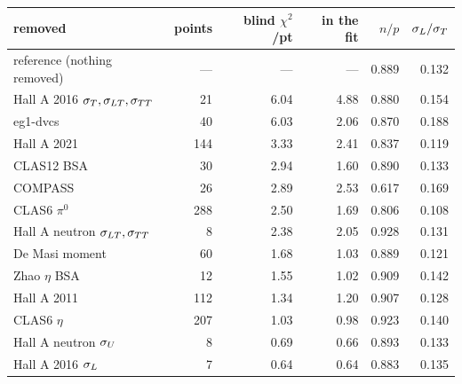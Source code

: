 \begin{tabular}{lrrrrr}
\toprule
removed & points & blind $\chi^2$/pt & in the fit & $n/p$ & $\sigma_{L}/\sigma_{T}$ \\
\midrule
reference (nothing removed) & --- & --- & --- & 0.889 & 0.132 \\
\midrule
Hall A 2016 $\sigma_{T},\sigma_{LT},\sigma_{TT}$ & 21 & 6.04 & 4.88 & 0.880 & 0.154 \\
eg1-dvcs & 40 & 6.03 & 2.06 & 0.870 & 0.188 \\
Hall A 2021 & 144 & 3.33 & 2.41 & 0.837 & 0.119 \\
CLAS12 BSA & 30 & 2.94 & 1.60 & 0.890 & 0.133 \\
COMPASS & 26 & 2.89 & 2.53 & 0.617 & 0.169 \\
CLAS6 $\pi^0$ & 288 & 2.50 & 1.69 & 0.806 & 0.108 \\
Hall A neutron $\sigma_{LT},\sigma_{TT}$ & 8 & 2.38 & 2.05 & 0.928 & 0.131 \\
De Masi moment & 60 & 1.68 & 1.03 & 0.889 & 0.121 \\
Zhao $\eta$ BSA & 12 & 1.55 & 1.02 & 0.909 & 0.142 \\
Hall A 2011 & 112 & 1.34 & 1.20 & 0.907 & 0.128 \\
CLAS6 $\eta$ & 207 & 1.03 & 0.98 & 0.923 & 0.140 \\
Hall A neutron $\sigma_{U}$ & 8 & 0.69 & 0.66 & 0.893 & 0.133 \\
Hall A 2016 $\sigma_{L}$ & 7 & 0.64 & 0.64 & 0.883 & 0.135 \\
\bottomrule
\end{tabular}
